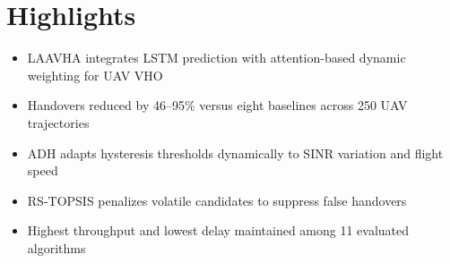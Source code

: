 \documentclass{article}
\begin{document}
\section*{Highlights}

\begin{itemize}
  \item LAAVHA integrates LSTM prediction with attention-based dynamic weighting for UAV VHO
  \item Handovers reduced by 46--95\% versus eight baselines across 250 UAV trajectories
  \item ADH adapts hysteresis thresholds dynamically to SINR variation and flight speed
  \item RS-TOPSIS penalizes volatile candidates to suppress false handovers
  \item Highest throughput and lowest delay maintained among 11 evaluated algorithms
\end{itemize}
\end{document}
